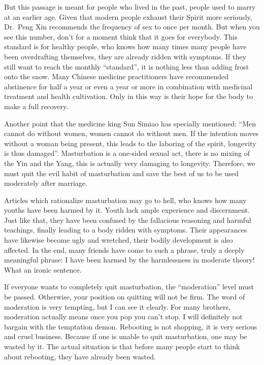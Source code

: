 \documentclass[
]{book}
\begin{document}
But this passage is meant for people who lived in the past, people used to marry at an earlier age. Given that modern people exhaust their Spirit more seriously, Dr.~Peng Xin recommends the frequency of sex to once per month. But when you see this number, don't for a moment think that it goes for everybody. This standard is for healthy people, who knows how many times many people have been overdrafting themselves, they are already ridden with symptoms. If they still want to reach the monthly ``standard'', it is nothing less than adding frost onto the snow. Many Chinese medicine practitioners have recommended abstinence for half a year or even a year or more in combination with medicinal treatment and health cultivation. Only in this way is their hope for the body to make a full recovery.

Another point that the medicine king Sun Simiao has specially mentioned: ``Men cannot do without women, women cannot do without men. If the intention moves without a woman being present, this leads to the laboring of the spirit, longevity is thus damaged''. Masturbation is a one-sided sexual act, there is no mixing of the Yin and the Yang, this is actually very damaging to longevity. Therefore, we must quit the evil habit of masturbation and save the best of us to be used moderately after marriage.

Articles which rationalize masturbation may go to hell, who knows how many youths have been harmed by it. Youth lack ample experience and discernment. Just like that, they have been confused by the fallacious reasoning and harmful teachings, finally leading to a body ridden with symptoms. Their appearances have likewise become ugly and wretched, their bodily development is also affected. In the end, many friends have come to such a phrase, truly a deeply meaningful phrase: I have been harmed by the harmlessness in moderate theory! What an ironic sentence.

If everyone wants to completely quit masturbation, the ``moderation'' level must be passed. Otherwise, your position on quitting will not be firm. The word of moderation is very tempting, but I can see it clearly. For many brothers, moderation actually means once you pop you can't stop. I will definitely not bargain with the temptation demon. Rebooting is not shopping, it is very serious and cruel business. Because if one is unable to quit masturbation, one may be wasted by it. The actual situation is that before many people start to think about rebooting, they have already been wasted.

  
\end{document}

